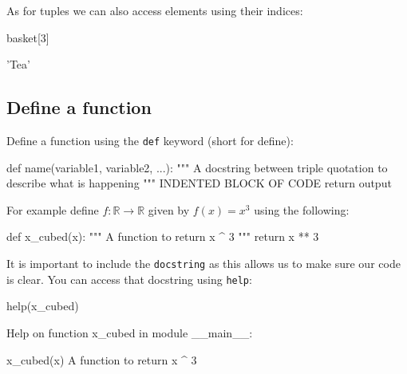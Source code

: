 \begin{pyin}
\end{pyin}





As for tuples we can also access elements using their indices:




\begin{pyin}
basket[3]
\end{pyin}





\begin{pyin}
'Tea'
\end{pyin}





\subsection{Define a function}
\label{sec:define_a_function}

Define a function using the \texttt{def} keyword (short for define):


\begin{pyin}
def name(variable1, variable2, ...):
    """
    A docstring between triple quotation to describe what is happening
    """
    INDENTED BLOCK OF CODE
    return output
\end{pyin}



For example define \(f:\mathbb{R}\to\mathbb{R}\) given by \(f(x) = x ^
3\) using the following:




\begin{pyin}
def x_cubed(x):
    """
    A function to return x ^ 3
    """
    return x ** 3
\end{pyin}

It is important to include the \texttt{docstring} as this allows us to make sure our
code is clear. You can access that docstring using \texttt{help}:

\begin{pyin}
help(x_cubed)
\end{pyin}





\begin{raw}
Help on function x_cubed in module __main__:

x_cubed(x)
    A function to return x ^ 3
\end{raw}





